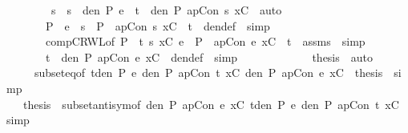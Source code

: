 \documentclass{llncs}
\newenvironment{isacode}
{\begin{list}{}{
\setlength{\leftmargin}{4pt}
\setlength{\rightmargin}{0pt}
\setlength{\listparindent}{0pt}\raggedright
\setlength{\itemsep}{0pt}
\setlength{\parsep}{0pt}
\normalfont\ttfamily }\item[]}
{\end{list}}
\begin{document}
{\begin{isacode}
\ \ \ \ \ \ \isamarkupfalse \ \isamarkupfalse \ s\ \ {\isachardoublequoteopen}{\isacharparenleft}s\ {\isasymin}\ den\ P\ e{\isacharparenright}\ {\isasymand}\ {\isacharparenleft}t\ {\isasymin}\ den\ P\ {\isacharparenleft}apCon\ s\ xC{\isacharparenright}{\isacharparenright}{\isachardoublequoteclose}\ \isamarkupfalse \ auto\isanewline
\ \ \ \ \ \ \isamarkupfalse \ {\isachardoublequoteopen}P\ {\isasymturnstile}\ e\ {\isasymrightarrow}\ s\ {\isasymand}\ P\ {\isasymturnstile}\ {\isacharparenleft}apCon\ s\ xC{\isacharparenright}\ {\isasymrightarrow}\ t{\isachardoublequoteclose}\ \isamarkupfalse \ den{\isacharunderscore}def\ \isamarkupfalse \ simp\isanewline
\ \ \ \ \ \ \isamarkupfalse \ compCRWL{}{\isacharbrackleft}of\ {\isachardoublequoteopen}P{\isachardoublequoteclose}\ {\isacharunderscore}\ {\isachardoublequoteopen}t{\isachardoublequoteclose}\ {\isachardoublequoteopen}s{\isachardoublequoteclose}\ {\isachardoublequoteopen}xC{\isachardoublequoteclose}\ {\isachardoublequoteopen}e{\isachardoublequoteclose}{\isacharbrackright}\ \isamarkupfalse \ {\isachardoublequoteopen}P\ {\isasymturnstile}\ {\isacharparenleft}apCon\ e\ xC{\isacharparenright}\ {\isasymrightarrow}\ t{\isachardoublequoteclose}\ \isamarkupfalse \ assms\ \isamarkupfalse \ simp\isanewline
\ \ \ \ \ \ \isamarkupfalse \ {\isachardoublequoteopen}t\ {\isasymin}\ den\ P\ {\isacharparenleft}apCon\ e\ xC{\isacharparenright}{\isachardoublequoteclose}\ \isamarkupfalse \ den{\isacharunderscore}def\ \isamarkupfalse \ simp\isanewline
\ \ \ \ \ \isacommand{{\isacharbraceright}}\isamarkupfalse \isanewline
\ \ \ \ \ \ \isamarkupfalse \ {\isacharquery}thesis\ \isamarkupfalse \ auto\isanewline
\ \ \ \ \isamarkupfalse \isanewline
\ \ \ \ \isamarkupfalse \ subset{\isacharunderscore}eq{\isacharbrackleft}of\ {\isachardoublequoteopen}{\isasymUnion}t{\isasymin}den\ P\ e{\isachardot}\ den\ P\ {\isacharparenleft}apCon\ t\ xC{\isacharparenright}{\isachardoublequoteclose}\ {\isachardoublequoteopen}den\ P\ {\isacharparenleft}apCon\ e\ xC{\isacharparenright}{\isachardoublequoteclose}{\isacharbrackright}\ \isamarkupfalse \ {\isacharquery}thesis\ \isamarkupfalse \ simp\isanewline
\ \ \isamarkupfalse \isanewline
{}\isamarkupfalse \isanewline
\ \ \isamarkupfalse \ {\isacharquery}thesis\ \isamarkupfalse \ subset{\isacharunderscore}antisym{\isacharbrackleft}of\ {\isachardoublequoteopen}den\ P\ {\isacharparenleft}apCon\ e\ xC{\isacharparenright}{\isachardoublequoteclose}\ {\isachardoublequoteopen}{\isasymUnion}t{\isasymin}den\ P\ e{\isachardot}\ den\ P\ {\isacharparenleft}apCon\ t\ xC{\isacharparenright}{\isachardoublequoteclose}{\isacharbrackright}\ \isamarkupfalse \ simp\isanewline
{}\isamarkupfalse \endisatagproof
{\isafoldproof}\end{isacode}}{

}
\end{document}
